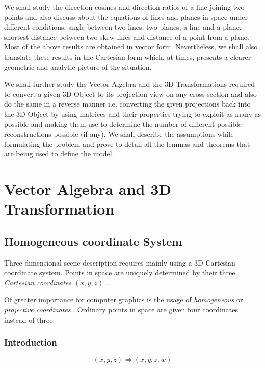 \documentclass[12pt]{report}
\begin{document}
\vspace{0.5cm}

We shall study the direction cosines and direction ratios of a line joining two points and also discuss about the equations of lines and planes in space under different conditions, angle between two lines, two planes, a line and a plane, shortest distance between two skew lines and distance of a point from a plane. Most of the above results are obtained in vector form. Nevertheless, we shall also translate these results in the Cartesian form which, at times, presents a clearer geometric and analytic picture of the situation.
\\
\vspace{0.5cm}

We shall further study the Vector Algebra and the 3D Transformations required to convert a given 3D Object to its projection view on any cross section and also do the same in a reverse manner i.e. converting the given projections back into the 3D Object by using matrices and their properties trying to exploit as many as possible and making them use to determine the number of different possible reconstructions possible (if any). We shall describe the assumptions while formulating the problem and prove to detail all the lemmas and theorems that are being used to define the model.
\\

\chapter{Vector Algebra and 3D Transformation}

\section{Homogeneous coordinate System}

Three-dimensional scene description requires mainly using a 3D Cartesian coordinate system. Points in space are uniquely determined by their three \textit{ Cartesian coordinates $(x, y, z)$ } .

\vspace{0.5cm}
\noindent Of greater importance for computer graphics is the usage of \textit{ homogeneous} or \textit{projective coordinates }. Ordinary points in space are given four coordinates instead of three:


\subsection{Introduction}
  \[ ( x , y , z ) \Leftrightarrow ( x , y , z , w ) \]
\end{document}

